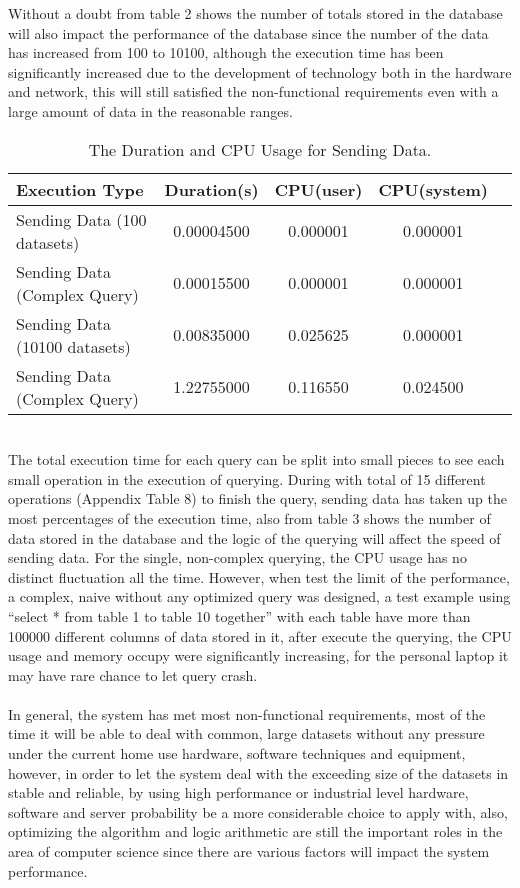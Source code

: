 \documentclass[12pt]{article}
\begin{document}
Without a doubt from table 2 shows the number of totals stored in the database will also impact the performance of the database since the number of the data has increased from 100 to 10100, although the execution time has been significantly increased due to the development of technology both in the hardware and network, this will still satisfied the non-functional requirements even with a large amount of data in the reasonable ranges.
\begin{table}[h]
\centering
\begin{tabular}{|l|c|c|c|c|}\hline
Execution Type&Duration(s)&CPU(user)&CPU(system)\\\hline
Sending Data (100 datasets)&0.00004500&0.000001&0.000001\\
Sending Data (Complex Query)&0.00015500&0.000001&0.000001\\\hline
Sending Data (10100 datasets)&0.00835000&0.025625&0.000001\\
Sending Data (Complex Query)&1.22755000&0.116550&0.024500\\\hline
\end{tabular}
\caption{The Duration and CPU Usage for Sending Data.}
\label{tab:Margin_settings}
\end{table}
\\The total execution time for each query can be split into small pieces to see each small operation in the execution of querying. During with total of 15 different operations (Appendix Table 8) to finish the query, sending data has taken up the most percentages of the execution time, also from table 3 shows the number of data stored in the database and the logic of the querying will affect the speed of sending data. For the single, non-complex querying, the CPU usage has no distinct fluctuation all the time. However, when test the limit of the performance, a complex, naive without any optimized query was designed, a test example using ``select * from table 1 to table 10 together'' with each table have more than 100000 different columns of data stored in it, after execute the querying, the CPU usage and memory occupy were significantly increasing, for the personal laptop it may have rare chance to let query crash.
\\
\\In general, the system has met most non-functional requirements, most of the time it will be able to deal with common, large datasets without any pressure under the current home use hardware, software techniques and equipment, however, in order to let the system deal with the exceeding size of the datasets in stable and reliable, by using high performance or industrial level hardware, software and server probability be a more considerable choice to apply with, also, optimizing the algorithm and logic arithmetic are still the important roles in the area of computer science since there are various factors will impact the system performance.
\end{document}
